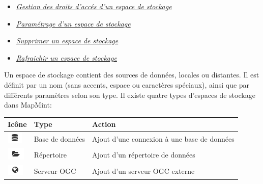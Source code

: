 \documentclass[letterpaper,10pt,french]{sphinxmanual}
\begin{document}
{\begin{minipage}{0.95\linewidth}
\begin{itemize}
\begin{itemize}
\begin{itemize}
\item {} 
\label{data/datastores:id11}{\hyperref[data/datastores:gestion-des-droits-d-acces-d-un-espace-de-stockage]{\emph{Gestion des droits d'accés d'un espace de stockage}}}

\item {} 
\label{data/datastores:id12}{\hyperref[data/datastores:parametrage-d-un-espace-de-stockage]{\emph{Paramétrage d'un espace de stockage}}}

\item {} 
\label{data/datastores:id13}{\hyperref[data/datastores:supprimer-un-espace-de-stockage]{\emph{Supprimer un espace de stockage}}}

\item {} 
\label{data/datastores:id14}{\hyperref[data/datastores:rafraichir-un-espace-de-stockage]{\emph{Rafraichir un espace de stockage}}}

\end{itemize}

\end{itemize}

\end{itemize}
\end{minipage}}
\begin{center}\setlength{\fboxsep}{5pt}\end{center}

Un espace de stockage contient des sources de données, locales ou
distantes. Il est définit par un nom (sans accents, espace ou
caractères spéciaux), ainsi que par différents paramètres selon son
type. Il existe quatre types d'espaces de stockage dans MapMint:

\begin{tabulary}{\linewidth}{|L|L|L|}
\hline

\textbf{Icône}
 & 
\textbf{Type}
 & 
\textbf{Action}
\\
\hline
\includegraphics{database.png}
 & 
Base de données
 & 
Ajout d'une connexion à une base de données
\\
\hline
\includegraphics{directory.png}
 & 
Répertoire
 & 
Ajout d'un répertoire de données
\\
\hline
\includegraphics{ogcserver.png}
 & 
Serveur OGC
 & 
Ajout d'un serveur OGC externe
\\
\hline\end{tabulary}
\end{document}
